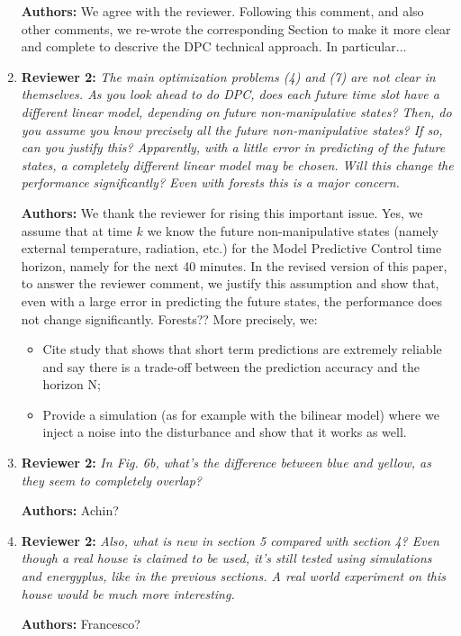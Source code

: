 \documentclass{article}
\begin{document}
\begin{enumerate}
\textbf{Authors:}  We agree with the reviewer. Following this comment, and also other comments, we re-wrote the corresponding Section to make it more clear and complete to descrive the DPC technical approach. In particular...



\item \textbf{Reviewer 2:} \textit{The main optimization problems (4) and (7) are not clear in themselves. As you look ahead to do DPC, does each future time slot have a different linear model, depending on future non-manipulative states? Then, do you assume you know precisely all the future non-manipulative states? If so, can you justify this? Apparently, with a little error in predicting of the future states, a completely different linear model may be chosen. Will this change the performance significantly? Even with forests this is a major concern.}



\textbf{Authors:} We thank the reviewer for rising this important issue. Yes, we assume that at time $k$ we know the future non-manipulative states (namely external temperature, radiation, etc.) for the Model Predictive Control time horizon, namely for the next 40 minutes. In the revised version of this paper, to answer the reviewer comment, we justify this assumption and show that, even with a large error in predicting the future states, the performance does not change significantly. Forests?? More precisely, we:

	\begin{itemize}

		\item Cite study that shows that short term predictions are extremely reliable and say there is a trade-off between the prediction accuracy and the horizon N;

		\item Provide a simulation (as for example with the bilinear model) where we inject a noise into the disturbance and show that it works as well.

	\end{itemize}



\item \textbf{Reviewer 2:} \textit{In Fig. 6b, what's the difference between blue and yellow, as they seem to completely overlap?}



\textbf{Authors:} Achin?



\item \textbf{Reviewer 2:} \textit{Also, what is new in section 5 compared with section 4? Even though a real house is claimed to be used, it's still tested using simulations and energyplus, like in the previous sections. A real world experiment on this house would be much more interesting.}



\textbf{Authors:} Francesco?


\end{enumerate}

%



%
\end{document}

